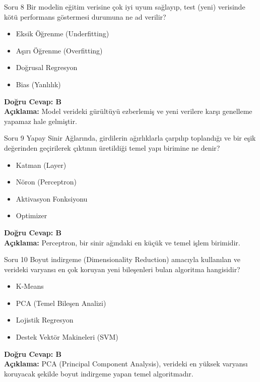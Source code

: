 \documentclass[12pt,a4paper]{article}
\begin{document}
\begin{testcard}{Soru 8}
    Bir modelin eğitim verisine çok iyi uyum sağlayıp, test (yeni) verisinde kötü performans göstermesi durumuna ne ad verilir?
    \begin{itemize}
        \item[A)] Eksik Öğrenme (Underfitting)
        \item[B)] Aşırı Öğrenme (Overfitting)
        \item[C)] Doğrusal Regresyon
        \item[D)] Bias (Yanlılık)
    \end{itemize}
    \tcblower
    \textbf{Doğru Cevap: B} \\
    \textbf{Açıklama:} Model verideki gürültüyü ezberlemiş ve yeni verilere karşı genelleme yapamaz hale gelmiştir.
\end{testcard}

\begin{testcard}{Soru 9}
    Yapay Sinir Ağlarında, girdilerin ağırlıklarla çarpılıp toplandığı ve bir eşik değerinden geçirilerek çıktının üretildiği temel yapı birimine ne denir?
    \begin{itemize}
        \item[A)] Katman (Layer)
        \item[B)] Nöron (Perceptron)
        \item[C)] Aktivasyon Fonksiyonu
        \item[D)] Optimizer
    \end{itemize}
    \tcblower
    \textbf{Doğru Cevap: B} \\
    \textbf{Açıklama:} Perceptron, bir sinir ağındaki en küçük ve temel işlem birimidir.
\end{testcard}

\begin{testcard}{Soru 10}
    Boyut indirgeme (Dimensionality Reduction) amacıyla kullanılan ve verideki varyansı en çok koruyan yeni bileşenleri bulan algoritma hangisidir?
    \begin{itemize}
        \item[A)] K-Means
        \item[B)] PCA (Temel Bileşen Analizi)
        \item[C)] Lojistik Regresyon
        \item[D)] Destek Vektör Makineleri (SVM)
    \end{itemize}
    \tcblower
    \textbf{Doğru Cevap: B} \\
    \textbf{Açıklama:} PCA (Principal Component Analysis), verideki en yüksek varyansı koruyacak şekilde boyut indirgeme yapan temel algoritmadır.
\end{testcard}
\end{document}
